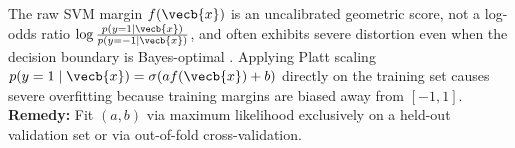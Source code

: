 \documentclass[../../../../master.tex]{subfiles}
\begin{document}
\begin{pitfall}
The raw SVM margin $f(\vecb{x})$ is an uncalibrated geometric score, not a log-odds ratio $\log \frac{p(y=1\mid\vecb{x})}{p(y=-1\mid\vecb{x})}$, and often exhibits severe distortion even when the decision boundary is Bayes-optimal . Applying Platt scaling $p(y=1 \mid \vecb{x}) = \sigma(a f(\vecb{x}) + b)$ directly on the training set causes severe overfitting because training margins are biased away from $[-1, 1]$. \textbf{Remedy:} Fit $(a, b)$ via maximum likelihood exclusively on a held-out validation set or via out-of-fold cross-validation.
\end{pitfall}
\end{document}
